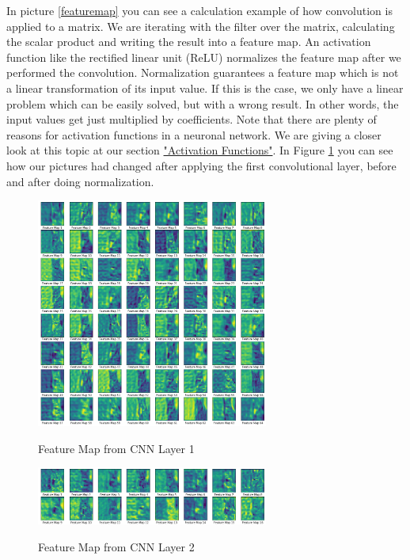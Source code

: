 \documentclass[journal]{IEEEtran}
\begin{document}
In picture \ref{featuremap} you can see a calculation example of how convolution is applied to a matrix. We are iterating with the filter over the matrix, calculating the scalar product and writing the result into a feature map. An activation function like the rectified linear unit (ReLU) normalizes the feature map after we performed the convolution. Normalization guarantees a feature map which is not a linear transformation of its input value. If this is the case, we only have a linear problem which can be easily solved, but with a wrong result. In other words, the input values get just multiplied by coefficients. Note that there are plenty of reasons for activation functions in a neuronal network. We are giving a closer look at this topic at our section \hyperref[sec:activationFunctions]{"Activation Functions"}. In Figure \ref{featuremap1} you can see how our pictures had changed after applying the first convolutional layer, before and after doing normalization.  \\

\begin{figure}
  \begin{center}
  \includegraphics[width=3in]{photo/feature_map1.png}\\
  \caption{Feature Map from CNN Layer 1}\label{featuremap1}
  \end{center}
\end{figure}

\begin{figure}
  \begin{center}
  \includegraphics[width=3in]{photo/feature_map2.png}\\
  \caption{Feature Map from CNN Layer 2}\label{featuremap2}
  \end{center}
\end{figure}
\end{document}
